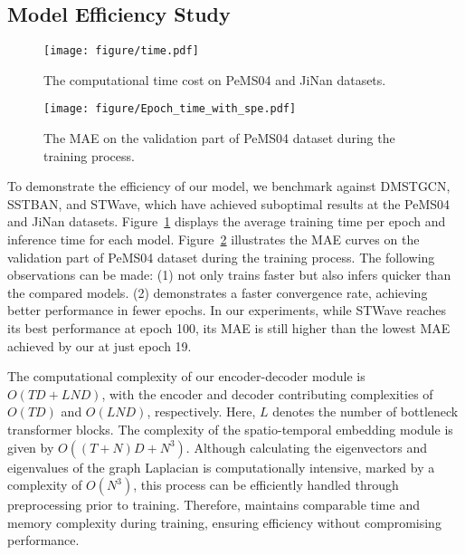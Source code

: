 \subsection{Model Efficiency Study}
\begin{figure}
    \begin{center}
    \texttt{[image: figure/time.pdf]}
    \caption{The computational time cost on PeMS04 and JiNan datasets.}
    \vspace{-3mm}
    \label{fig:time}
    \end{center}
\end{figure}
% 
% 
\begin{figure}
    \centering
    \vspace{-1mm}
    \texttt{[image: figure/Epoch\_time\_with\_spe.pdf]}
    \vspace{-0.5mm}
    \caption{The MAE on the validation part of PeMS04 dataset during the training process.}
    \vspace{-4mm}
    \label{fig:epoch}
\end{figure}
To demonstrate the efficiency of our model, we benchmark \model against DMSTGCN, SSTBAN, and STWave, which have achieved suboptimal results at the PeMS04 and JiNan datasets. Figure~\ref{fig:time} displays the average training time per epoch and inference time for each model. Figure~\ref{fig:epoch} illustrates the MAE curves on the validation part of PeMS04 dataset during the training process. The following observations can be made: (1) \model not only trains faster but also infers quicker than the compared models. (2) \model demonstrates a faster convergence rate, achieving better performance in fewer epochs. In our experiments, while STWave reaches its best performance at epoch 100, its MAE is still higher than the lowest MAE achieved by our \model at just epoch 19. 

The computational complexity of our \model encoder-decoder module is $O(TD + LND)$, with the encoder and decoder contributing complexities of $O(TD)$ and $O(LND)$, respectively. Here, $L$ denotes the number of bottleneck transformer blocks. The complexity of the spatio-temporal embedding module is given by $O((T + N)D + N^3)$. Although calculating the eigenvectors and eigenvalues of the graph Laplacian is computationally intensive, marked by a complexity of  $O(N^3)$, this process can be efficiently handled through preprocessing prior to training. Therefore, \model maintains comparable time and memory complexity during training, ensuring efficiency without compromising performance.